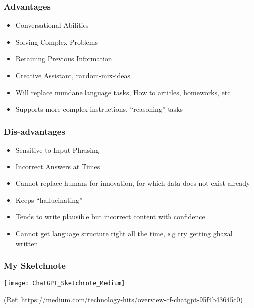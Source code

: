 \begin{frame}[fragile]\frametitle{Advantages}


\begin{itemize}
\item Conversational Abilities
\item Solving Complex Problems
\item Retaining Previous Information
\item Creative Assistant, random-mix-ideas
\item Will replace mundane language tasks, How to articles, homeworks, etc
\item Supports more complex instructions, ``reasoning'' tasks
\end{itemize}	 

\end{frame}

\begin{frame}[fragile]\frametitle{Dis-advantages}


\begin{itemize}
\item Sensitive to Input Phrasing
\item Incorrect Answers at Times
\item Cannot replace humans for innovation, for which data does not exist already
\item Keeps ``hallucinating''
\item Tends to write plausible but incorrect content with confidence
\item Cannot get language structure right all the time, e.g try getting ghazal written
\end{itemize}	 

\end{frame}



\begin{frame}[fragile]\frametitle{My Sketchnote}

\begin{center}
\texttt{[image: ChatGPT\_Sketchnote\_Medium]}
\end{center}		

{\tiny (Ref: https://medium.com/technology-hits/overview-of-chatgpt-95f4b43645c0)}
			

\end{frame}


